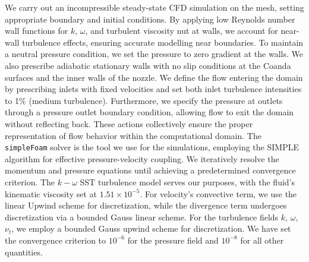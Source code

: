 We carry out an incompressible steady-state CFD simulation on the mesh, setting appropriate boundary and initial conditions. By applying low Reynolds number wall functions for $k$, $\omega$, and turbulent viscosity \gls{nut} at walls, we account for near-wall turbulence effects, ensuring accurate modelling near boundaries. To maintain a neutral pressure condition, we set the pressure to zero gradient at the walls. We also prescribe adiabatic stationary walls with no slip conditions at the Coanda surfaces and the inner walls of the nozzle. We define the flow entering the domain by prescribing inlets with fixed velocities and set both inlet turbulence intensities to 1\% (medium turbulence). Furthermore, we specify the pressure at outlets through a pressure outlet boundary condition, allowing flow to exit the domain without reflecting back. These actions collectively ensure the proper representation of flow behavior within the computational domain. The \verb|simpleFoam| solver is the tool we use for the simulations, employing the \gls{SIMPLE} algorithm for effective pressure-velocity coupling. We iteratively resolve the momentum and pressure equations until achieving a predetermined convergence criterion. The $k-\omega$ SST turbulence model serves our purposes, with the fluid's kinematic viscosity set at $1.51 \times {10}^{-5}$. For velocity's convective term, we use the linear Upwind scheme for discretization, while the divergence term undergoes discretization via a bounded Gauss linear scheme. For the turbulence fields $k$, $\omega$, $\nu_t$, we employ a bounded Gauss upwind scheme for discretization. We have set the convergence criterion to ${10}^{-6}$ for the pressure field and ${10}^{-8}$ for all other quantities.
